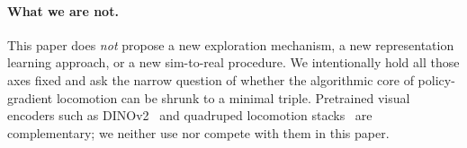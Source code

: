 \paragraph{What we are not.}
This paper does \emph{not} propose a new exploration mechanism, a
new representation learning approach, or a new sim-to-real
procedure. We intentionally hold all those axes fixed and ask the
narrow question of whether the algorithmic core of policy-gradient
locomotion can be shrunk to a minimal triple. Pretrained visual
encoders such as DINOv2~\cite{oquab2024dinov2} and quadruped
locomotion stacks~\cite{hwangbo2019anymal} are complementary; we
neither use nor compete with them in this paper.
